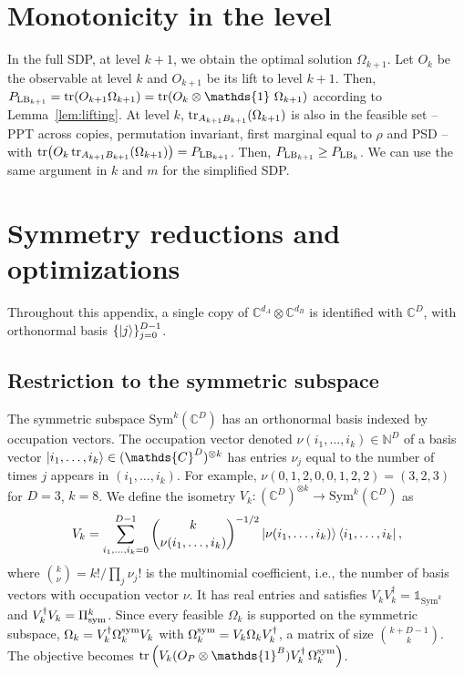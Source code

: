 \documentclass[aps,pra,twocolumn,showpacs,superscriptaddress,groupedaddress]{revtex4-2}
\newcommand{\one}[0]{\mathds{1}}
\newcommand{\N}{\mathds{N}}
\newcommand{\C}{\mathds{C}}
\newcommand{\I}{\one}
\begin{document}
\begin{widetext}
\section{Monotonicity in the level}\label{app:monotonicity}
In the full SDP, at level $k+1$, we obtain the optimal solution $\Omega_{k+1}$. Let $O_k$ be the observable at level $k$ and $O_{k+1}$ be its lift to level $k+1$. Then, $P_{{\rm LB}_{k+1}} = \tr(O_{k+1} \Omega_{k+1})=\tr(O_k \otimes \I \ \Omega_{k+1})$ according to Lemma~\ref{lem:lifting}. At level $k$, $\tr_{A_{k+1}B_{k+1}}(\Omega_{k+1})$ is also in the feasible set -- PPT across copies, permutation invariant, first marginal equal to $\rho$ and PSD -- with $\tr(O_k \tr_{A_{k+1}B_{k+1}}(\Omega_{k+1})) = P_{{\rm LB}_{k+1}}$. Then, $P_{{\rm LB}_{k+1}} \geq P_{{\rm LB}_{k}}$.
We can use the same argument in $k$ and $m$ for the simplified SDP.

\section{Symmetry reductions and optimizations}\label{app:SymRed}
Throughout this appendix, a single copy of $\C^{d_A}\otimes\C^{d_B}$ is identified with $\C^D$, with orthonormal basis $\{\ket{j}\}_{j=0}^{D-1}$.

\subsection{Restriction to the symmetric subspace}
The symmetric subspace $\text{Sym}^k(\C^D)$ has an orthonormal basis indexed by occupation vectors. The occupation vector denoted $\nu(i_1,\dots,i_k)\in\N^D$ of a basis vector $\ket{i_1,\dots,i_k}\in(\C^D)^{\otimes k}$ has entries $\nu_j$ equal to the number of times $j$ appears in $(i_1,\dots,i_k)$. For example, $\nu(0,1,2,0,0,1,2,2)=(3,2,3)$ for $D=3$, $k=8$. We define the isometry $V_k:(\C^D)^{\otimes k}\to\text{Sym}^k(\C^D)$ as
\begin{equation}
    V_k = \sum_{i_1, \dots, i_k=0}^{D-1} \binom{k}{\nu(i_1, \dots, i_k)}^{-1/2}\ket{\nu(i_1, \dots, i_k)}\bra{i_1, \dots, i_k},
\end{equation}
where $\binom{k}{\nu}=k!/\prod_j\nu_j!$ is the multinomial coefficient, i.e., the number of basis vectors with occupation vector $\nu$. It has real entries and satisfies $V_kV_k^\dagger=\I_{\text{Sym}^k}$ and $V_k^\dagger V_k=\Pi_{\rm sym}^{k}$. Since every feasible $\Omega_k$ is supported on the symmetric subspace, $\Omega_k=V_k^\dagger\Omega_k^{\rm sym}V_k$ with $\Omega_k^{\rm sym}=V_k\Omega_kV_k^\dagger$, a matrix of size $\binom{k+D-1}{k}$. The objective becomes $\tr\left(V_k(O_P\otimes\I^B)V_k^\dagger\,\Omega_k^{\rm sym}\right)$.


\end{widetext}
\end{document}
